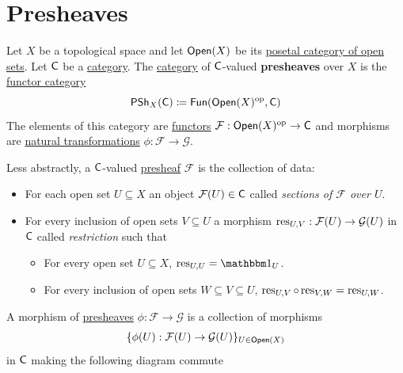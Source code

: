 \documentclass[../../../main]{subfiles}
\begin{document}
\section{Presheaves} \label{sec:presheaves}

\begin{definition}[Presheaf] \label{def:presheaf}
  Let \(X\) be a topological space and let \(\mathsf{Open}(X)\) be its \hyperref[ex:open-set-category]{posetal category of open sets}.
  Let \(\mathsf{C}\) be a \hyperref[def:category]{category}.
  The \hyperref[def:category]{category} of \(\mathsf{C}\)-valued \textbf{presheaves} over \(X\) is the \hyperref[def:functor-category]{functor category}
  \begin{equation*}
    \mathsf{PSh}_{X}(\mathsf{C}) \coloneq \mathsf{Fun}(\mathsf{Open}(X)^{\operatorname*{op}}, \mathsf{C})
  \end{equation*}
  The elements of this category are \hyperref[def:functor]{functors} \(\mathcal{F}: \mathsf{Open}(X)^{\operatorname*{op}} \to \mathsf{C}\) and morphisms are \hyperref[def:natural-transformation]{natural transformations} \(\phi: \mathcal{F} \to \mathcal{G}\).
\end{definition}

Less abstractly, a \(\mathsf{C}\)-valued \hyperref[def:presheaf]{presheaf} \(\mathcal{F}\) is the collection of data:
\begin{itemize}
  \item For each open set \(U \subseteq X\) an object \(\mathcal{F}(U) \in \mathsf{C}\) called \textit{sections of \(\mathcal{F}\) over \(U\)}.
  \item For every inclusion of open sets \(V \subseteq U\) a morphism \(\operatorname{res}_{U, V}: \mathcal{F}(U) \to \mathcal{G}(U)\) in \(\mathsf{C}\) called \textit{restriction} such that
        \begin{itemize}
          \item For every open set \(U \subseteq X\), \(\res_{U, U} = \id_{U}\).
          \item For every inclusion of open sets \(W \subseteq V \subseteq U\), \(\operatorname{res}_{U, V} \circ \operatorname{res}_{V, W} = \operatorname{res}_{U, W}\).
        \end{itemize}
\end{itemize}
A morphism of \hyperref[def:presheaf]{presheaves} \(\phi: \mathcal{F} \to \mathcal{G}\) is a collection of morphisms
\begin{equation*}
  \{\phi(U): \mathcal{F}(U) \to \mathcal{G}(U)\}_{U \in \mathsf{Open}(X)}
\end{equation*}
in \(\mathsf{C}\) making the following diagram commute
\begin{center}
\end{center}
\end{document}

